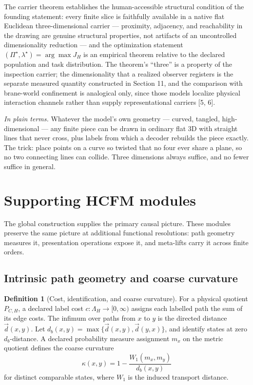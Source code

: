 \documentclass[11pt]{article}
\theoremstyle{definition}
\newtheorem{definition}{Definition}
\newcommand{\plainterms}{\emph{In plain terms.}}
\begin{document}
The carrier theorem establishes the human-accessible structural condition of the founding statement: every finite slice is faithfully available in a native flat Euclidean three-dimensional carrier --- proximity, adjacency, and reachability in the drawing are genuine structural properties, not artifacts of an uncontrolled dimensionality reduction --- and the optimization statement $(\Pi^{\star}, \lambda^{\star}) = \arg\max J_H$ is an empirical theorem relative to the declared population and task distribution. The theorem's ``three'' is a property of the inspection carrier; the dimensionality that a realized observer registers is the separate measured quantity constructed in Section 11, and the comparison with brane-world confinement is analogical only, since those models localize physical interaction channels rather than supply representational carriers [5, 6].

\noindent\plainterms{} Whatever the model's own geometry --- curved, tangled, high-dimensional --- any finite piece can be drawn in ordinary flat 3D with straight lines that never cross, plus labels from which a decoder rebuilds the piece exactly. The trick: place points on a curve so twisted that no four ever share a plane, so no two connecting lines can collide. Three dimensions always suffice, and no fewer suffice in general.

\section{Supporting HCFM modules}

The global construction supplies the primary causal picture. These modules preserve the same picture at additional functional resolutions: path geometry measures it, presentation operations expose it, and meta-lifts carry it across finite orders.

\subsection{Intrinsic path geometry and coarse curvature}

\begin{definition}[Cost, identification, and coarse curvature]
For a physical quotient $P_{C,H}$, a declared label cost $c : \Lambda_H \to [0, \infty)$ assigns each labelled path the sum of its edge costs. The infimum over paths from $x$ to $y$ is the directed distance $\vec{d}(x, y)$. Let $d_b(x, y) = \max\{\vec{d}(x, y), \vec{d}(y, x)\}$, and identify states at zero $d_b$-distance. A declared probability measure assignment $m_x$ on the metric quotient defines the coarse curvature
\[
\kappa(x, y) = 1 - \frac{W_1(m_x, m_y)}{d_b(x, y)}
\]
for distinct comparable states, where $W_1$ is the induced transport distance.
\end{definition}
\end{document}
